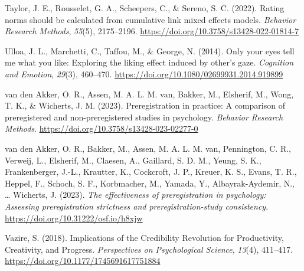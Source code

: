 \documentclass[
  man]{apa7}
\newlength{\cslhangindent}
\newenvironment{CSLReferences}[2] %
 {\begin{list}{}{%
  \setlength{\itemindent}{0pt}
  \setlength{\leftmargin}{0pt}
  \setlength{\parsep}{0pt}
  \ifodd #1
   \setlength{\leftmargin}{\cslhangindent}
   \setlength{\itemindent}{-1\cslhangindent}
  \fi
  \setlength{\itemsep}{#2\baselineskip}}}
 {\end{list}}
\begin{document}
\begin{CSLReferences}{1}{0}
Taylor, J. E., Rousselet, G. A., Scheepers, C., \& Sereno, S. C. (2022). Rating norms should be calculated from cumulative link mixed effects models. \emph{Behavior Research Methods}, \emph{55}(5), 2175--2196. \url{https://doi.org/10.3758/s13428-022-01814-7}

Ulloa, J. L., Marchetti, C., Taffou, M., \& George, N. (2014). Only your eyes tell me what you like: Exploring the liking effect induced by other's gaze. \emph{Cognition and Emotion}, \emph{29}(3), 460--470. \url{https://doi.org/10.1080/02699931.2014.919899}

van den Akker, O. R., Assen, M. A. L. M. van, Bakker, M., Elsherif, M., Wong, T. K., \& Wicherts, J. M. (2023). Preregistration in practice: A comparison of preregistered and non-preregistered studies in psychology. \emph{Behavior Research Methods}. \url{https://doi.org/10.3758/s13428-023-02277-0}

van den Akker, O. R., Bakker, M., Assen, M. A. L. M. van, Pennington, C. R., Verweij, L., Elsherif, M., Claesen, A., Gaillard, S. D. M., Yeung, S. K., Frankenberger, J.-L., Krautter, K., Cockcroft, J. P., Kreuer, K. S., Evans, T. R., Heppel, F., Schoch, S. F., Korbmacher, M., Yamada, Y., Albayrak-Aydemir, N., \ldots{} Wicherts, J. (2023). \emph{The effectiveness of preregistration in psychology: Assessing preregistration strictness and preregistration-study consistency}. \url{https://doi.org/10.31222/osf.io/h8xjw}

Vazire, S. (2018). Implications of the Credibility Revolution for Productivity, Creativity, and Progress. \emph{Perspectives on Psychological Science}, \emph{13}(4), 411--417. \url{https://doi.org/10.1177/1745691617751884}

\end{CSLReferences}

\endgroup
\end{document}
